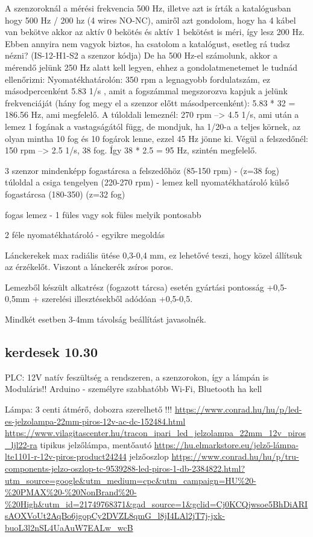 \documentclass{article}
\begin{document}
	A szenzoroknál a mérési frekvencia 500 Hz, illetve azt is írták a katalógusban hogy 500 Hz / 200 hz (4 wires NO-NC), amiről azt gondolom, hogy ha 4 kábel van bekötve akkor az aktív 0 bekötés és aktív 1 bekötést is méri, így lesz 200 Hz. Ebben annyira nem vagyok biztos, ha csatolom a katalógust, esetleg rá tudsz nézni? (IS-12-H1-S2 a szenzor kódja)
	De ha 500 Hz-el számolunk, akkor a mérendő jelünk 250 Hz alatt kell legyen, ehhez a gondolatmenetemet le tudnád ellenőrizni:
	Nyomatékhatárolón: 350 rpm a legnagyobb fordulatszám, ez másodpercenként 5.83 1/s , amit a fogszámmal megszorozva kapjuk a jelünk frekvenciáját (hány fog megy el a szenzor előtt másodpercenként): 5.83 * 32 = 186.56 Hz, ami megfelelő.
	A túloldali lemeznél: 270 rpm --> 4.5 1/s, ami után a lemez 1 fogának a vastagságától függ, de mondjuk, ha 1/20-a a teljes körnek, az olyan mintha 10 fog és 10 fogárok lenne, ezzel 45 Hz jönne ki.
	Végül a felszedőnél: 150 rpm --> 2.5 1/s, 38 fog. Így 38 * 2.5 = 95 Hz, szintén megfelelő.	
	
	
	3 szenzor mindenképp
	fogastárcsa a felszedőhöz (85-150 rpm) - (z=38 fog)
	túloldal a csiga tengelyen (220-270 rpm) - lemez kell
	nyomatékhatároló külső fogastárcsa (180-350) (z=32 fog)
	
	fogas lemez - 1 füles vagy sok füles melyik pontosabb
	
	2 féle nyomatékhatároló - egyikre megoldás
	
	Lánckerekek max radiális ütése 0,3-0,4 mm, ez lehetővé teszi, hogy közel állítsuk az érzékelőt. Viszont a lánckerék zsíros poros.
	
	Lemezből készült alkatrész (fogazott tárcsa) esetén gyártási pontosság +0,5-0,5mm + szerelési illesztésekből adódóan +0,5-0,5.
	
	Mindkét esetben 3-4mm távolság beállítást javasolnék. 
	
	\subsection{kerdesek 10.30}
	
	PLC: 12V
	natív feszültség a rendszeren, a szenzorokon, így a lámpán is
	Moduláris!!
	Arduino - személyre szabhatóbb
	Wi-Fi, Bluetooth ha kell
	
	Lámpa:
	3 centi átmérő, dobozra szerelhető !!!
	\url{https://www.conrad.hu/hu/p/led-es-jelzolampa-22mm-piros-12v-ac-dc-152484.html}
	\url{https://www.vilagitascenter.hu/tracon_ipari_led_jelzolampa_22mm_12v_piros_ljl22-ra}
	tipikus jelzőlámpa, mentőautó 
	\url{https://hu.elmarkstore.eu/jelző-lámpa-lte1101-r-12v-piros-product24244}
	jelzőoszlop \url{https://www.conrad.hu/hu/p/tru-components-jelzo-oszlop-tc-9539288-led-piros-1-db-2384822.html?utm_source=google&utm_medium=cpc&utm_campaign=HU%20-%20PMAX%20-%20NonBrand%20-%20High&utm_id=21749768371&gad_source=1&gclid=Cj0KCQjwsoe5BhDiARIsAOXVoUt2AqBo6jgopCy2DVZL8qmG_l8jI4LAl2jT7j-jxk-buoL3l2nSL4UaAuW7EALw_wcB}
	
\end{document}
